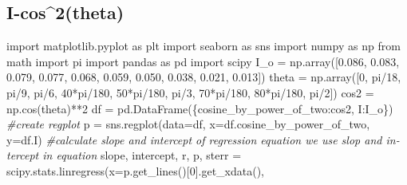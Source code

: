 \documentclass{article}
\newenvironment{Shaded}{}{}
\newcommand{\CommentTok}[1]{\textcolor[rgb]{0.38,0.63,0.69}{\textit{#1}}}
\newcommand{\DecValTok}[1]{\textcolor[rgb]{0.25,0.63,0.44}{#1}}
\newcommand{\FloatTok}[1]{\textcolor[rgb]{0.25,0.63,0.44}{#1}}
\newcommand{\ImportTok}[1]{#1}
\newcommand{\NormalTok}[1]{#1}
\newcommand{\OperatorTok}[1]{\textcolor[rgb]{0.40,0.40,0.40}{#1}}
\newcommand{\StringTok}[1]{\textcolor[rgb]{0.25,0.44,0.63}{#1}}
\begin{document}
\begin{latin}
\hypertarget{i-cos2theta}{%
\section{I-cos\^{}2(theta)}\label{i-cos2theta}}
\begin{Shaded}
\begin{Highlighting}[]
\ImportTok{import}\NormalTok{ matplotlib.pyplot }\ImportTok{as}\NormalTok{ plt}
\ImportTok{import}\NormalTok{ seaborn }\ImportTok{as}\NormalTok{ sns}
\ImportTok{import}\NormalTok{ numpy }\ImportTok{as}\NormalTok{ np}
\ImportTok{from}\NormalTok{ math }\ImportTok{import}\NormalTok{ pi}
\ImportTok{import}\NormalTok{ pandas }\ImportTok{as}\NormalTok{ pd}
\ImportTok{import}\NormalTok{ scipy}
\NormalTok{I\_o }\OperatorTok{=}\NormalTok{ np.array([}\FloatTok{0.086}\NormalTok{, }\FloatTok{0.083}\NormalTok{, }\FloatTok{0.079}\NormalTok{, }\FloatTok{0.077}\NormalTok{, }\FloatTok{0.068}\NormalTok{, }\FloatTok{0.059}\NormalTok{, }\FloatTok{0.050}\NormalTok{, }\FloatTok{0.038}\NormalTok{, }\FloatTok{0.021}\NormalTok{, }\FloatTok{0.013}\NormalTok{])}
\NormalTok{theta }\OperatorTok{=}\NormalTok{ np.array([}\DecValTok{0}\NormalTok{, pi}\OperatorTok{/}\DecValTok{18}\NormalTok{, pi}\OperatorTok{/}\DecValTok{9}\NormalTok{, pi}\OperatorTok{/}\DecValTok{6}\NormalTok{, }\DecValTok{40}\OperatorTok{*}\NormalTok{pi}\OperatorTok{/}\DecValTok{180}\NormalTok{, }\DecValTok{50}\OperatorTok{*}\NormalTok{pi}\OperatorTok{/}\DecValTok{180}\NormalTok{, pi}\OperatorTok{/}\DecValTok{3}\NormalTok{, }\DecValTok{70}\OperatorTok{*}\NormalTok{pi}\OperatorTok{/}\DecValTok{180}\NormalTok{, }\DecValTok{80}\OperatorTok{*}\NormalTok{pi}\OperatorTok{/}\DecValTok{180}\NormalTok{, pi}\OperatorTok{/}\DecValTok{2}\NormalTok{])}
\NormalTok{cos2 }\OperatorTok{=}\NormalTok{ np.cos(theta)}\OperatorTok{**}\DecValTok{2}
\NormalTok{df }\OperatorTok{=}\NormalTok{ pd.DataFrame(\{}\StringTok{\textquotesingle{}cosine\_by\_power\_of\_two\textquotesingle{}}\NormalTok{:cos2, }\StringTok{\textquotesingle{}I\textquotesingle{}}\NormalTok{:I\_o\})}
\CommentTok{\#create regplot}
\NormalTok{p }\OperatorTok{=}\NormalTok{ sns.regplot(data}\OperatorTok{=}\NormalTok{df, x}\OperatorTok{=}\NormalTok{df.cosine\_by\_power\_of\_two, y}\OperatorTok{=}\NormalTok{df.I)}
\CommentTok{\#calculate slope and intercept of regression equation we use slop and intercept in equation}
\NormalTok{slope, intercept, r, p, sterr }\OperatorTok{=}\NormalTok{ scipy.stats.linregress(x}\OperatorTok{=}\NormalTok{p.get\_lines()[}\DecValTok{0}\NormalTok{].get\_xdata(),}

\end{Highlighting}
\end{Shaded}
\end{latin}
\end{document}
